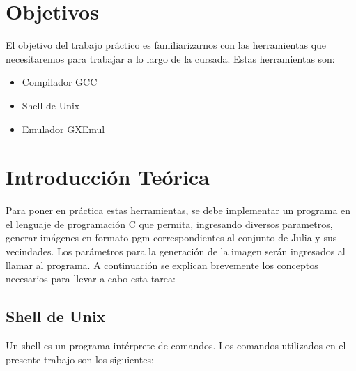  

\pagestyle{empty} %

\titleGP %

\newpage

\pagestyle{plain}

\section{Objetivos}
	El objetivo del trabajo práctico es familiarizarnos con las herramientas que necesitaremos para trabajar a lo largo de la cursada. Estas herramientas son:
	\begin{itemize}
	  \item Compilador GCC
	  \item Shell de Unix
	  \item Emulador GXEmul
	\end{itemize}

\section{Introducción Teórica}
  \label{sec:InfoTeo}
  Para poner en práctica estas herramientas, se debe implementar un programa en el lenguaje de programación C que permita, ingresando diversos parametros,
  generar imágenes en formato pgm correspondientes al conjunto de Julia y sus vecindades. Los parámetros para la generación de la imagen serán ingresados 
  al llamar al programa.
  A continuación se explican brevemente los conceptos necesarios para llevar a cabo esta tarea:

  \vspace{0.5cm}
	\subsection{Shell de Unix}
	  Un shell es un programa intérprete de comandos. Los comandos utilizados en el presente trabajo
	  son los siguientes:

